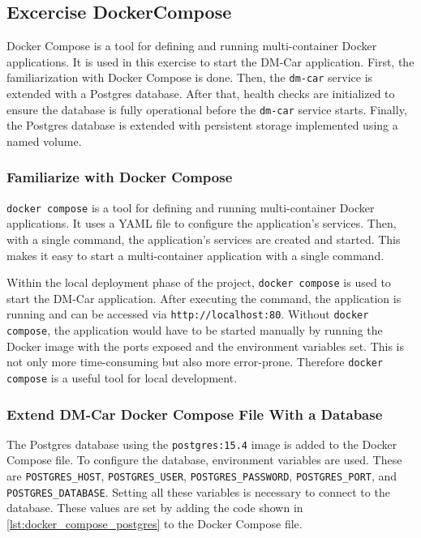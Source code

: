 \subsection{Excercise DockerCompose}
Docker Compose \cite{Doc-Com} is a tool for defining and running multi-container Docker applications.
It is used in this exercise to start the DM-Car application.
First, the familiarization with Docker Compose is done.
Then, the \texttt{dm-car} service is extended with a Postgres database.
After that, health checks are initialized to ensure the database is fully operational before the \texttt{dm-car} service starts.
Finally, the Postgres database is extended with persistent storage implemented using a named volume.

\subsubsection*{Familiarize with Docker Compose}
\texttt{docker compose} is a tool for defining and running multi-container Docker applications.
It uses a YAML file to configure the application's services.
Then, with a single command, the application's services are created and started.
This makes it easy to start a multi-container application with a single command.

Within the local deployment phase of the project, \texttt{docker compose} is used to start the DM-Car application.
After executing the command, the application is running and can be accessed via \texttt{http://localhost:80}.
Without \texttt{docker compose}, the application would have to be started manually by running the Docker image with the ports exposed and the environment variables set.
This is not only more time-consuming but also more error-prone.
Therefore \texttt{docker compose} is a useful tool for local development.

\subsubsection*{Extend DM-Car Docker Compose File With a Database}
The Postgres database using the \texttt{postgres:15.4} image is added to the Docker Compose file.
To configure the database, environment variables are used.
These are \texttt{POSTGRES\_HOST}, \texttt{POSTGRES\_USER}, \texttt{POSTGRES\_PASSWORD}, \texttt{POSTGRES\_PORT}, and \texttt{POSTGRES\_DATABASE}.
Setting all these variables is necessary to connect to the database.
These values are set by adding the code shown in \autoref*{lst:docker_compose_postgres} to the Docker Compose file.

